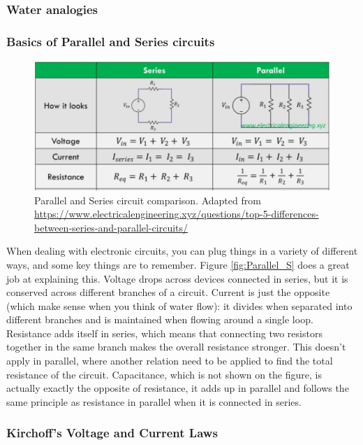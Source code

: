 \subsubsection{Water analogies}


\subsubsection{Basics of Parallel and Series circuits}

\begin{figure}[H]
    \centering
    \includegraphics[width=0.75\linewidth]{../../Figures/Parallel_Series.PNG}
    \caption{Parallel and Series circuit comparison. Adapted from \url{https://www.electricalengineering.xyz/questions/top-5-differences-between-series-and-parallel-circuits/}}
    \label{fig:Parallel_Series}
\end{figure}

When dealing with electronic circuits, you can plug things in a variety of different ways, and some key things are to remember. Figure \ref{fig:Parallel_S} does a great job at explaining this. Voltage drops across devices connected in series, but it is conserved across different branches of a circuit. Current is just the opposite (which make sense when you think of water flow): it divides when separated into different branches and is maintained when flowing around a single loop. Resistance adds itself in series, which means that connecting two resistors together in the same branch makes the overall resistance stronger. This doesn't apply in parallel, where another relation need to be applied to find the total resistance of the circuit. Capacitance, which is not shown on the figure, is actually exactly the opposite of resistance, it adds up in parallel and follows the same principle as resistance in parallel when it is connected in series. 

\subsubsection{Kirchoff's Voltage and Current Laws}

